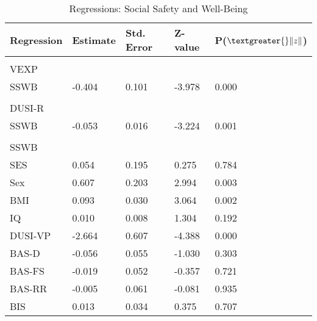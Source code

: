\documentclass[utf8]{article}
\begin{document}
\begin{table}[]
\begin{tabular}{lllll}
Regression  & Estimate & Std. Error & Z-value & P($\textgreater{}\|z\|$) \\ \hline
            &          &            &         &                          \\
VEXP        &          &            &         &                          \\
SSWB        & -0.404   & 0.101      & -3.978  & 0.000                    \\
            &          &            &         &                          \\
DUSI-R      &          &            &         &                          \\
SSWB        & -0.053   & 0.016      & -3.224  & 0.001                    \\
            &          &            &         &                          \\
SSWB        &          &            &         &                          \\
SES         & 0.054    & 0.195      & 0.275   & 0.784                    \\
Sex         & 0.607    & 0.203      & 2.994   & 0.003                    \\
BMI         & 0.093    & 0.030      & 3.064   & 0.002                    \\
IQ          & 0.010    & 0.008      & 1.304   & 0.192                    \\
DUSI-VP     & -2.664   & 0.607      & -4.388  & 0.000                    \\
BAS-D       & -0.056   & 0.055      & -1.030  & 0.303                    \\
BAS-FS      & -0.019   & 0.052      & -0.357  & 0.721                    \\
BAS-RR      & -0.005   & 0.061      & -0.081  & 0.935                    \\
BIS         & 0.013    & 0.034      & 0.375   & 0.707                   
\end{tabular}
\caption{Regressions: Social Safety and Well-Being\label{tab:8}}
\end{table}
\end{document}
